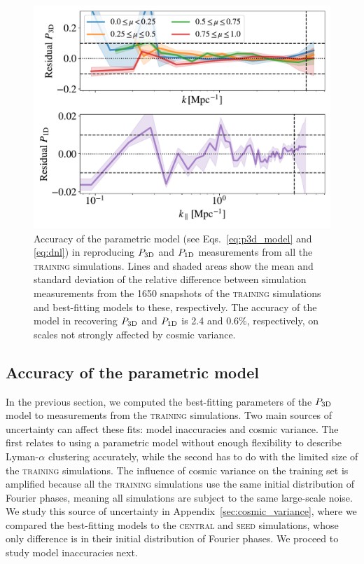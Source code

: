 \documentclass[longauth]{aa}
\newcommand{\lya}{Lyman-$\alpha$\xspace}
\newcommand{\poned}{\ensuremath{P_{\rm 1D}}\xspace}
\newcommand{\pthreed}{\ensuremath{P_{\rm 3D}}\xspace}
\newcommand{\lacehc}{\textsc{training}\xspace}
\newcommand{\simseed}{\textsc{seed}\xspace}
\newcommand{\simcentral}{\textsc{central}\xspace}
\begin{document}


\begin{figure}
\includegraphics[width=\columnwidth]{figures/goodness_fit_all.pdf}
\centering
\caption{Accuracy of the parametric model (see Eqs.~\ref{eq:p3d_model} and \ref{eq:dnl}) in reproducing \pthreed and \poned measurements from all the \lacehc simulations. Lines and shaded areas show the mean and standard deviation of the relative difference between simulation measurements from the 1650 snapshots of the \lacehc simulations and best-fitting models to these, respectively. The accuracy of the model in recovering \pthreed and \poned is 2.4 and 0.6\%, respectively, on scales not strongly affected by cosmic variance.}
\label{fig:goodness}
\end{figure}

\subsection{Accuracy of the parametric model}
\label{sec:input_precision}

In the previous section, we computed the best-fitting parameters of the \pthreed model to measurements from the \lacehc simulations. Two main sources of uncertainty can affect these fits: model inaccuracies and cosmic variance. The first relates to using a parametric model without enough flexibility to describe \lya clustering accurately, while the second has to do with the limited size of the \lacehc simulations. The influence of cosmic variance on the training set is amplified because all the \lacehc simulations use the same initial distribution of Fourier phases, meaning all simulations are subject to the same large-scale noise. We study this source of uncertainty in Appendix~\ref{sec:cosmic_variance}, where we compared the best-fitting models to the \simcentral and \simseed simulations, whose only difference is in their initial distribution of Fourier phases. We proceed to study model inaccuracies next.
\end{document}
